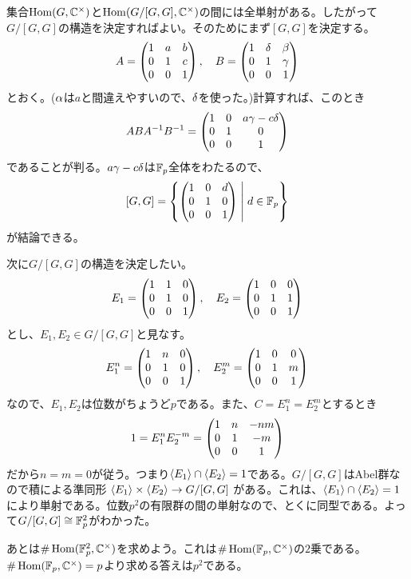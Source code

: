 \subsubsection{} %
\begin{sol}
 集合$\operatorname{Hom}(G, {\mathbb C}^{\times})$と$\operatorname{Hom}(G/[G,G], {\mathbb C}^{\times})$の間には全単射がある。したがって$G/[G,G]$の構造を決定すればよい。そのためにまず$[G,G]$を決定する。
    \[
    A = \begin{pmatrix} 1 & a & b \\ 0 & 1 & c \\ 0 & 0 & 1 \end{pmatrix},  \quad B = \begin{pmatrix} 1 & {\delta} & \beta \\ 0 & 1 & {\gamma} \\ 0 & 0 & 1 \end{pmatrix}
    \]
    とおく。(${\alpha}$は$a$と間違えやすいので、${\delta}$を使った。)計算すれば、このとき
    \begin{align*}
    ABA^{-1}B^{-1} = \begin{pmatrix} 1 & 0  & a {\gamma} - c {\delta} \\ 0 & 1 & 0 \\ 0 & 0 & 1  \end{pmatrix}
  \end{align*}
  であることが判る。$a {\gamma} - c {\delta}$は${\mathbb F}_p$全体をわたるので、
  \[
  [G,G] = \left\{  \begin{pmatrix} 1 & 0 & d \\ 0 & 1 & 0 \\ 0 & 0 & 1 \end{pmatrix}  \mathrel{} \middle| \mathrel{} d \in {\mathbb F}_p  \right\}
  \]
  が結論できる。

  次に$G/[G,G]$の構造を決定したい。
  \[
  E_1 = \begin{pmatrix} 1 & 1 & 0 \\ 0 & 1 & 0 \\ 0 & 0 & 1 \end{pmatrix}, \quad E_2 =  \begin{pmatrix} 1 & 0 & 0 \\ 0 & 1 & 1 \\ 0 & 0 & 1 \end{pmatrix}
  \]
  とし、$E_1, E_2 \in G/ [G,G]$と見なす。
  \[
  E_1^n = \begin{pmatrix} 1 & n & 0 \\ 0 & 1 & 0 \\ 0 & 0 & 1 \end{pmatrix}, \quad E_2^m =  \begin{pmatrix} 1 & 0 & 0 \\ 0 & 1 & m \\ 0 & 0 & 1 \end{pmatrix}
  \]
  なので、$E_1, E_2$は位数がちょうど$p$である。また、$C = E_1^n = E_2^m$とするとき
  \[
  1 = E_1^n E_2^{-m} = \begin{pmatrix}  1 & n & -nm \\ 0 & 1 & -m \\ 0 & 0 & 1 \end{pmatrix}
  \]
  だから$n=m=0$が従う。つまり$\langle E_1 \rangle \cap \langle E_2 \rangle = 1$である。$G/[G,G]$はAbel群なので積による準同形
  $
\langle E_1 \rangle \times \langle E_2 \rangle \to G/[G,G]
  $
  がある。これは、$\langle E_1 \rangle \cap \langle E_2 \rangle = 1$により単射である。位数$p^2$の有限群の間の単射なので、とくに同型である。よって$G/[G,G] \cong {\mathbb F}_p^2$がわかった。

あとは$\# \operatorname{Hom}({\mathbb F}_p^2, {\mathbb C}^{\times})$を求めよう。これは$\# \operatorname{Hom}({\mathbb F}_p,{\mathbb C}^{\times})$の$2$乗である。$\# \operatorname{Hom}({\mathbb F}_p,{\mathbb C}^{\times}) = p$より求める答えは$p^2$である。

\end{sol}

